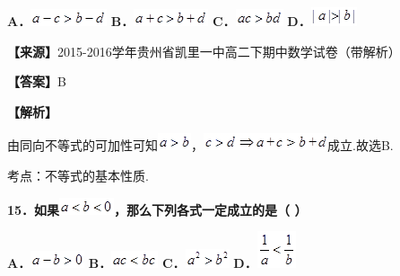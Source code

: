 \documentclass[
]{article}
\begin{document}
\textbf{A．}\includegraphics[width=0.88554in,height=0.19794in]{Fig//media/image153.png}
\textbf{B．}\includegraphics[width=0.8647in,height=0.19794in]{Fig//media/image154.png}
\textbf{C．}\includegraphics[width=0.55216in,height=0.19794in]{Fig//media/image155.png}
\textbf{D．}\includegraphics[width=0.53132in,height=0.21878in]{Fig//media/image156.png}

\textbf{【来源】}2015-2016学年贵州省凯里一中高二下期中数学试卷（带解析）

\textbf{【答案】}B

\textbf{【解析】}

由同向不等式的可加性可知\includegraphics[width=0.38547in,height=0.19794in]{Fig//media/image157.png}，\includegraphics[width=0.40631in,height=0.19794in]{Fig//media/image158.png}\includegraphics[width=1.03139in,height=0.19794in]{Fig//media/image159.png}成立.故选B.

考点：不等式的基本性质.

\textbf{15．如果}\includegraphics[width=0.63551in,height=0.19794in]{Fig//media/image160.png}\textbf{，那么下列各式一定成立的是（
）}

\textbf{A．}\includegraphics[width=0.62509in,height=0.19794in]{Fig//media/image161.png}
\textbf{B．}\includegraphics[width=0.54174in,height=0.19794in]{Fig//media/image162.png}
\textbf{C．}\includegraphics[width=0.51049in,height=0.21878in]{Fig//media/image163.png}
\textbf{D．}\includegraphics[width=0.44798in,height=0.42714in]{Fig//media/image164.png}
\end{document}
